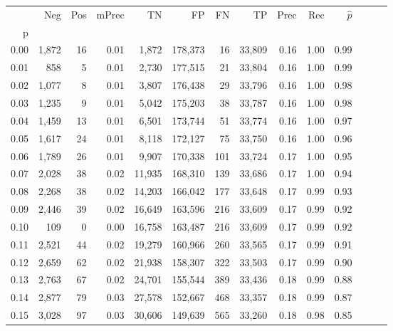 \begin{tabular}{rrrrrrrrrrrrrr}
\toprule
{} &    Neg &  Pos & mPrec &       TN &       FP &      FN &      TP &  Prec &   Rec & $\hat{p}$ \\
p    &        &      &       &          &          &         &         &       &       &           \\
\midrule
0.00 &  1,872 &   16 &  0.01 &    1,872 &  178,373 &      16 &  33,809 &  0.16 &  1.00 &      0.99 \\
0.01 &    858 &    5 &  0.01 &    2,730 &  177,515 &      21 &  33,804 &  0.16 &  1.00 &      0.99 \\
0.02 &  1,077 &    8 &  0.01 &    3,807 &  176,438 &      29 &  33,796 &  0.16 &  1.00 &      0.98 \\
0.03 &  1,235 &    9 &  0.01 &    5,042 &  175,203 &      38 &  33,787 &  0.16 &  1.00 &      0.98 \\
0.04 &  1,459 &   13 &  0.01 &    6,501 &  173,744 &      51 &  33,774 &  0.16 &  1.00 &      0.97 \\
0.05 &  1,617 &   24 &  0.01 &    8,118 &  172,127 &      75 &  33,750 &  0.16 &  1.00 &      0.96 \\
0.06 &  1,789 &   26 &  0.01 &    9,907 &  170,338 &     101 &  33,724 &  0.17 &  1.00 &      0.95 \\
0.07 &  2,028 &   38 &  0.02 &   11,935 &  168,310 &     139 &  33,686 &  0.17 &  1.00 &      0.94 \\
0.08 &  2,268 &   38 &  0.02 &   14,203 &  166,042 &     177 &  33,648 &  0.17 &  0.99 &      0.93 \\
0.09 &  2,446 &   39 &  0.02 &   16,649 &  163,596 &     216 &  33,609 &  0.17 &  0.99 &      0.92 \\
0.10 &    109 &    0 &  0.00 &   16,758 &  163,487 &     216 &  33,609 &  0.17 &  0.99 &      0.92 \\
0.11 &  2,521 &   44 &  0.02 &   19,279 &  160,966 &     260 &  33,565 &  0.17 &  0.99 &      0.91 \\
0.12 &  2,659 &   62 &  0.02 &   21,938 &  158,307 &     322 &  33,503 &  0.17 &  0.99 &      0.90 \\
0.13 &  2,763 &   67 &  0.02 &   24,701 &  155,544 &     389 &  33,436 &  0.18 &  0.99 &      0.88 \\
0.14 &  2,877 &   79 &  0.03 &   27,578 &  152,667 &     468 &  33,357 &  0.18 &  0.99 &      0.87 \\
0.15 &  3,028 &   97 &  0.03 &   30,606 &  149,639 &     565 &  33,260 &  0.18 &  0.98 &      0.85 \\

\end{tabular}
